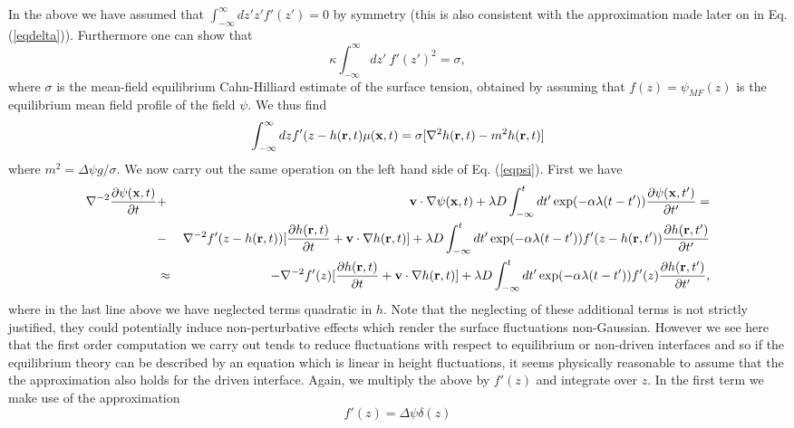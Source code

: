 In the above we have assumed that $\int_{-\infty}^\infty dz' z'f'(z')=0$ by symmetry (this is also consistent with the approximation made later on in Eq. (\ref{eqdelta})). Furthermore one can show that \cite{bray2001,bray2002}
\begin{equation}
    \kappa\int_{-\infty}^\infty dz' \ f'(z')^2 = \sigma,
    \label{mfsig}
\end{equation}
where $\sigma$ is the mean-field equilibrium Cahn-Hilliard estimate of the surface tension, obtained by  assuming that $f(z)=\psi_{MF}(z)$ is the equilibrium mean field profile of the field 
$\psi$. We thus find
\begin{equation}
    \int_{-\infty}^\infty dz f'(z-h({\bf r},t)\mu({\bf x},t) = \sigma[\nabla^2 h({\bf r},t)-m^2 h({\bf r},t)]
\end{equation}
where $m^2 = \Delta\psi g /\sigma$. We now carry out the same operation on the left hand side of Eq. (\ref{eqpsi}). First we have
\begin{eqnarray}
\nabla^{-2}\frac{\partial \psi({\bf x},t)}{\partial t}&+&{\bf v}\cdot\nabla \psi({\bf x},t) +\lambda D\int_{-\infty}^t dt'
\exp(-\alpha\lambda(t-t')) \frac{\partial \psi({\bf x},t')}{\partial t'} = \nonumber \\ 
&-&\nabla^{-2}f'(z-h({\bf r},t))[\frac{\partial h({\bf r},t)}{\partial t} +{\bf v}\cdot\nabla h({\bf r},t)]  +\lambda D\int_{-\infty}^t dt'
\exp(-\alpha\lambda(t-t')) f'(z-h({\bf r},t'))\frac{\partial h({\bf r},t')}{\partial t'}\nonumber \\
&\approx& -\nabla^{-2}f'(z) [\frac{\partial h({\bf r},t)}{\partial t} +{\bf v}\cdot\nabla h({\bf r},t)] +\lambda D\int_{-\infty}^t dt'
\exp(-\alpha\lambda(t-t')) f'(z)\frac{\partial h({\bf r},t')}{\partial t'},\end{eqnarray}
where in the last line above we have neglected terms quadratic in $h$. 
Note that the neglecting of these additional terms is not strictly justified, they could potentially induce non-perturbative effects which render the surface fluctuations non-Gaussian. However we see here that the first order computation we carry out tends to reduce fluctuations with respect to equilibrium or non-driven interfaces and so if the equilibrium theory can be described by an equation which is linear in height fluctuations, it seems physically reasonable to assume that the the approximation also holds for the driven interface. 
Again, we multiply the above by $f'(z)$ and integrate over $z$. In the first term we make use of the approximation
\begin{equation}
    f'(z)=\Delta\psi \delta(z)
    \label{eqdelta}
\end{equation}
